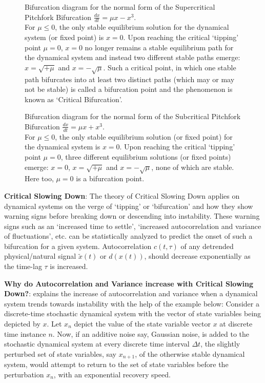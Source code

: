 \begin{figure}[!ht]
	\label{fig:bifPitchforkSupercritical}
	\caption{Bifurcation diagram for the normal form of the Supercritical Pitchfork Bifurcation $\frac{dx}{dt} = \mu x - x^3$. \\ For $\mu \leq 0$, the only stable equilibrium solution for the dynamical system (or fixed point) is $x=0$. Upon reaching the critical `tipping' point $\mu=0$, $x=0$ no longer remains a stable equilibrium path for the dynamical system and instead two different stable paths emerge: $x = \sqrt{+\mu}$ and $x = -\sqrt{\mu}$. Such a critical point, in which one stable path bifurcates into at least two distinct paths (which may or may not be stable) is called a bifurcation point and the phenomenon is known as `Critical Bifurcation'.}
\end{figure}

\begin{figure}[!ht]
	\label{fig:bifPitchforkSubcritical}
	\caption{Bifurcation diagram for the normal form of the Subcritical Pitchfork Bifurcation $\frac{dx}{dt} = \mu x + x^3$. \\ For $\mu \leq 0$, the only stable equilibrium solution (or fixed point) for the dynamical system is $x=0$. Upon reaching the critical `tipping' point $\mu=0$, three different equilibrium solutions (or fixed points) emerge: $x=0$, $x = \sqrt{+\mu}$ and $x = -\sqrt{\mu}$, none of which are stable. Here too, $\mu=0$ is a bifurcation point.}
\end{figure}


\textbf{Critical Slowing Down}: The theory of Critical Slowing Down applies on dynamical systems on the verge of `tipping' or `bifurcation' and how they show warning signs before breaking down or descending into instability. These warning signs such as an `increased time to settle', `increased autocorrelation and variance of fluctuations', etc. \cite{schefferEarlyWarningSignalsForCriticalTransitions} can be statistically analyzed to predict the onset of such a bifurcation for a given system.
Autocorrelation $c(t, \tau)$ of any detrended physical/natural signal $\tilde{x}(t)$ or $d(x(t))$, should decrease exponentially as the time-lag $\tau$ is increased.

\textbf{Why do Autocorrelation and Variance increase with Critical Slowing Down?}:
\cite{schefferEarlyWarningSignalsForCriticalTransitions} explains the increase of autocorrelation and variance when a dynamical system trends towards instability with the help of the example below:
Consider a discrete-time stochastic dynamical system with the vector of state variables being depicted by $x$. Let $x_n$ depict the value of the state variable vector $x$ at discrete time instance $n$.
Now, if an additive noise say, Gaussian noise, is added to the stochastic dynamical system at every discrete time interval $\Delta t$, the slightly perturbed set of state variables, say $x_{n+1}$, of the otherwise stable dynamical system, would attempt to return to the set of state variables before the perturbation $x_n$, with an exponential recovery speed.

